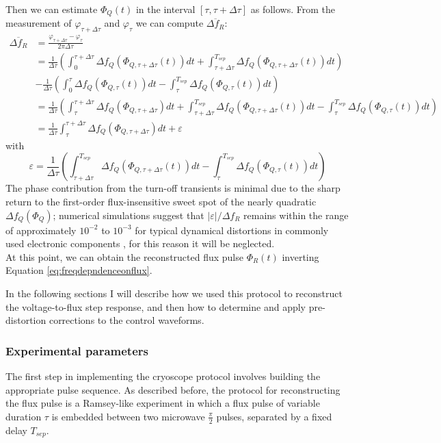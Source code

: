 Then we can estimate $\Phi_Q(t)$ in the interval $[\tau,\tau+\Delta\tau]$ as follows. From the measurement of $\varphi_{\tau + \Delta\tau}$ and $\varphi_\tau$ we can compute $\overline{\Delta f_R}$:
\begin{align}\label{eq:detuning}
    \overline{\Delta f_R} &= \frac{\varphi_{\tau+\Delta\tau} - \varphi_\tau}{2\pi\Delta\tau}\\ 
    &= \frac{1}{\Delta\tau}\left(\int_{0}^{\tau+\Delta\tau}\Delta f_Q (\Phi_{Q,\tau+\Delta\tau}(t))dt + \int_{\tau+\Delta\tau}^{T_{sep}}\Delta f_Q (\Phi_{Q,\tau+\Delta\tau}(t))dt\right) \\
    &-\frac{1}{\Delta\tau}\left(\int_{0}^{\tau}\Delta f_Q (\Phi_{Q,\tau}(t))dt - \int_{\tau}^{T_{sep}}\Delta f_Q (\Phi_{Q,\tau}(t))dt\right)\\
    &=\frac{1}{\Delta\tau}\left(\int_{\tau}^{\tau+\Delta\tau} \Delta f_Q(\Phi_{Q,\tau+\Delta\tau})dt + \int_{\tau+\Delta\tau}^{T_{sep}}\Delta f_Q (\Phi_{Q,\tau+\Delta\tau}(t))dt - \int_{\tau}^{T_{sep}}\Delta f_Q (\Phi_{Q,\tau}(t))dt\right)\\
    &= \frac{1}{\Delta\tau}\int_{\tau}^{\tau+\Delta\tau} \Delta f_Q(\Phi_{Q,\tau+\Delta\tau})dt + \varepsilon
\end{align}  
with \[\varepsilon = \frac{1}{\Delta\tau}\left(\int_{\tau+\Delta\tau}^{T_{sep}}\Delta f_Q (\Phi_{Q,\tau+\Delta\tau}(t))dt - \int_{\tau}^{T_{sep}}\Delta f_Q (\Phi_{Q,\tau}(t))dt\right)\]
The phase contribution from the turn-off transients is minimal due to the sharp return to the first-order flux-insensitive sweet spot of the nearly quadratic $\Delta f_Q(\Phi_Q)$; 
numerical simulations suggest that $|\varepsilon|/\Delta f_R$ remains within the range of approximately $10^{-2}$ to $10^{-3}$ for typical dynamical distortions in commonly used electronic components \cite{negligible} \cite{Langford2017}, for this reason it will be neglected.\\

At this point, we can obtain the reconstructed flux pulse $\Phi_R(t)$ inverting Equation \ref{eq:freqdepndenceonflux}.

In the following sections I will describe how we used this protocol to reconstruct the voltage-to-flux step response, and then how to determine and apply pre-distortion corrections to the control waveforms.

\subsubsection{Experimental parameters}
The first step in implementing the cryoscope protocol involves building the appropriate pulse sequence. 
As described before, the protocol for reconstructing the flux pulse is a Ramsey-like experiment in which a flux pulse of variable duration $\tau$ is embedded between two microwave $\frac{\pi}{2}$ pulses, separated by a fixed delay $T_{sep}$.

